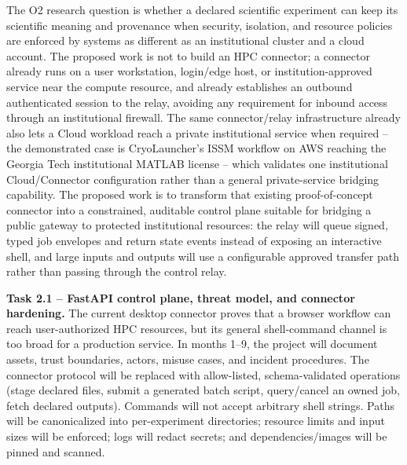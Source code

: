 The O2 research question is whether a declared scientific experiment can keep
its scientific meaning and provenance when security, isolation, and resource
policies are enforced by systems as different as an institutional cluster and a
cloud account. The proposed work is not to build an HPC connector; a connector already runs
on a user workstation, login/edge host, or institution-approved service near
the compute resource, and already establishes an outbound authenticated
session to the relay, avoiding any requirement for inbound access through an
institutional firewall. The same connector/relay infrastructure already also
lets a Cloud workload reach a private institutional service when required --
the demonstrated case is CryoLauncher's ISSM workflow on AWS reaching the
Georgia Tech institutional MATLAB license -- which validates one
institutional Cloud/Connector configuration rather than a general
private-service bridging capability. The proposed work is to transform that existing
proof-of-concept connector into a constrained, auditable control plane
suitable for bridging a public gateway to protected institutional resources:
the relay will queue signed, typed job envelopes and return state events
instead of exposing an interactive shell, and large inputs and outputs will
use a configurable approved transfer path rather than passing through the
control relay.

\textbf{Task 2.1 -- FastAPI control plane, threat model, and connector hardening.} The current desktop
connector proves that a browser workflow can reach user-authorized HPC
resources, but its general shell-command channel is too broad for a production
service. In months 1--9, the project will document assets, trust boundaries,
actors, misuse cases, and incident procedures. The connector protocol will be
replaced with allow-listed, schema-validated operations (stage declared files,
submit a generated batch script, query/cancel an owned job, fetch declared
outputs). Commands will not accept arbitrary shell strings. Paths will be
canonicalized into per-experiment directories; resource limits and input sizes
will be enforced; logs will redact secrets; and dependencies/images will be
pinned and scanned.

